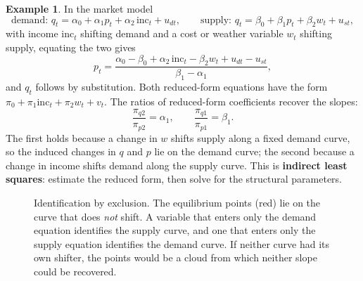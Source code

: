 \documentclass[11pt,a4paper]{article}
\numberwithin{equation}{section}
\theoremstyle{definition}
\newtheorem{exa}[thm]{Example}
\begin{document}
\begin{exa}
\label{ex:market}
In the market model
\[
\text{demand: } q_t = \alpha_0 + \alpha_1p_t + \alpha_2\,\text{inc}_t + u_{dt}, \qquad \text{supply: } q_t = \beta_0 + \beta_1p_t + \beta_2w_t + u_{st},
\]
with income $\text{inc}_t$ shifting demand and a cost or weather variable $w_t$ shifting supply, equating the two gives
\[
p_t = \frac{\alpha_0 - \beta_0 + \alpha_2\,\text{inc}_t - \beta_2w_t + u_{dt} - u_{st}}{\beta_1 - \alpha_1},
\]
and $q_t$ follows by substitution. Both reduced-form equations have the form $\pi_0 + \pi_1\text{inc}_t + \pi_2w_t + v_t$. The ratios of reduced-form coefficients
recover the slopes:
\[
\frac{\pi_{q2}}{\pi_{p2}} = \alpha_1, \qquad \frac{\pi_{q1}}{\pi_{p1}} = \beta_1 .
\]
The first holds because a change in $w$ shifts supply along a fixed demand curve, so the induced changes in $q$ and $p$ lie on the demand curve; the
second because a change in income shifts demand along the supply curve. This is \textbf{indirect least squares}: estimate the reduced form, then solve
for the structural parameters.
\end{exa}

\begin{figure}[H]
\centering
{}
\caption{Identification by exclusion. The equilibrium points (red) lie on the curve that does \emph{not} shift. A variable that enters only the demand
equation identifies the supply curve, and one that enters only the supply equation identifies the demand curve. If neither curve had its own shifter,
the points would be a cloud from which neither slope could be recovered.}
\label{fig:identify}
\end{figure}
\end{document}
